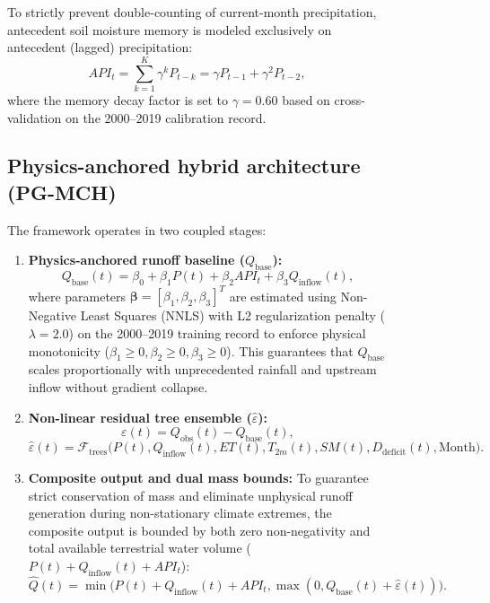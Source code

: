 \documentclass[11pt,a4paper,fleqn]{article}
\begin{document}
\begin{figure}[htbp]
To strictly prevent double-counting of current-month precipitation, antecedent soil moisture memory is modeled exclusively on antecedent (lagged) precipitation:
\begin{equation}
API_t = \sum_{k=1}^{K} \gamma^k P_{t-k} = \gamma P_{t-1} + \gamma^2 P_{t-2},
\end{equation}
where the memory decay factor is set to $\gamma = 0.60$ based on cross-validation on the 2000--2019 calibration record.

\subsection{Physics-anchored hybrid architecture (PG-MCH)}
The framework operates in two coupled stages:
\begin{enumerate}
    \item \textbf{Physics-anchored runoff baseline ($Q_{\text{base}}$):}
    \begin{equation}
    Q_{\text{base}}(t) = \beta_0 + \beta_1 P(t) + \beta_2 API_t + \beta_3 Q_{\text{inflow}}(t),
    \end{equation}
    where parameters $\boldsymbol{\beta} = [\beta_1, \beta_2, \beta_3]^T$ are estimated using Non-Negative Least Squares (NNLS) with L2 regularization penalty ($\lambda = 2.0$) on the 2000--2019 training record to enforce physical monotonicity ($\beta_1 \ge 0, \beta_2 \ge 0, \beta_3 \ge 0$). This guarantees that $Q_{\text{base}}$ scales proportionally with unprecedented rainfall and upstream inflow without gradient collapse.
    \item \textbf{Non-linear residual tree ensemble ($\hat{\varepsilon}$):}
    \begin{equation}
    \varepsilon(t) = Q_{\text{obs}}(t) - Q_{\text{base}}(t),
    \end{equation}
    \begin{equation}
    \hat{\varepsilon}(t) = \mathcal{F}_{\text{trees}}\big(P(t), Q_{\text{inflow}}(t), ET(t), T_{2m}(t), SM(t), D_{\text{deficit}}(t), \text{Month}\big).
    \end{equation}
    \item \textbf{Composite output and dual mass bounds:}
    To guarantee strict conservation of mass and eliminate unphysical runoff generation during non-stationary climate extremes, the composite output is bounded by both zero non-negativity and total available terrestrial water volume ($P(t) + Q_{\text{inflow}}(t) + API_t$):
    \begin{equation}
    \hat{Q}(t) = \min\Big(P(t) + Q_{\text{inflow}}(t) + API_t, \max\left(0, Q_{\text{base}}(t) + \hat{\varepsilon}(t)\right)\Big).
    \end{equation}
\end{enumerate}


\end{figure}
\end{document}
